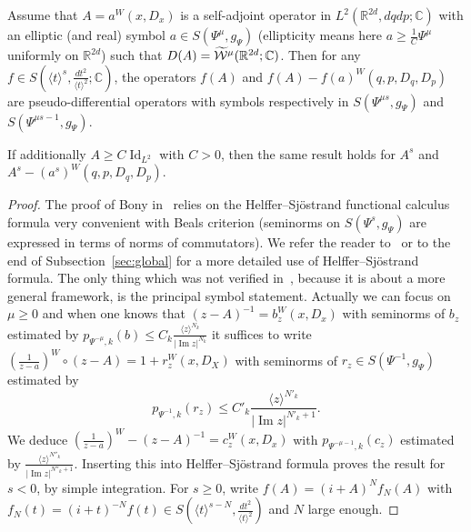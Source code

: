 \documentclass[AHL,Unicode,longabstracts]{cedram}
\newcommand{\C}{\mathbb{C}}
\newcommand{\R}{\mathbb{R}}
\newcommand{\clW}{\mathcal{W}}
\DeclareMathOperator{\Idd}{Id}
\DeclareMathOperator{\Imm}{Im}
\let\oldtilde\tilde
\renewcommand*{\tilde}[1]{\mathchoice{\widetilde{#1}}{\widetilde{#1}}{\oldtilde{#1}}{\oldtilde{#1}}}
\begin{document}
\begin{prop}\label{pr:Bealsfunction}
Assume that $A=a^{W}(x,D_{x})$ is a self-adjoint operator in $L^{2}(\R^{2d},dqdp;\C)$ with an elliptic (and real) symbol $a\in S(\Psi^{\mu},g_{\Psi})$ (ellipticity means here $a\geq \frac{1}{C}\Psi^{\mu}$ uniformly on $\R^{2d}$) such that $D(A)=\tilde{\clW}^{\mu}(\R^{2d};\C)$. Then for any $f\in S(\langle t\rangle^{s}, \frac{dt^{2}}{\langle t\rangle^{2}}; \C)$, the operators $f(A)$ and $f(A)-f(a)^{W}(q,p,D_{q},D_{p})$ are pseudo-differential operators with symbols respectively in $S(\Psi^{\mu s},g_{\Psi})$ and $S(\Psi^{\mu s-1},g_{\Psi})$.

If additionally $A\geq C\Idd_{L^{2}}$ with $C>0$, then the same result holds for $A^{s}$ and $A^{s}-(a^{s})^{W}(q,p,D_{q},D_{p})$.
\end{prop}
\begin{proof}
The proof of Bony in~\cite[Theorem~3.8]{Bon} relies on the Helffer--Sj\"ostrand functional calculus formula very convenient with Beals criterion (seminorms on $S(\Psi^{s},g_{\Psi})$ are expressed in terms of norms of commutators). We refer the reader to~\cite{Bon,DiSj,HeSj} or to the end of Subsection~\ref{sec:global} for a more detailed use of Helffer--Sj\"ostrand formula. The only thing which was not verified in~\cite{Bon}, because it is about a more general framework, is the principal symbol statement. Actually we can focus on $\mu\geq 0$ and when one knows that $(z-A)^{-1}=b_{z}^{W}(x,D_{x})$ with seminorms of $b_{z}$ estimated by $p_{\Psi^{-\mu},k}(b)\leq C_{k}\frac{\langle z\rangle^{N_{k}}}{|\Imm z|^{N_{k}}}$ it suffices to write $(\frac{1}{z-a})^{W}\circ(z-A)=1+r^{W}_{z}(x,D_{X})$ with seminorms of $r_{z}\in S(\Psi^{-1},g_{\Psi})$ estimated by
\[
p_{\Psi^{-1}, k}(r_{z})\leq C'_{k}\frac{\langle z\rangle^{N'_{k}}}{|\Imm z|^{N'_{k}+1}}.
\]
We deduce $(\frac{1}{z-a})^{W}-(z-A)^{-1}=c_{z}^{W}(x,D_{x})$ with $p_{\Psi^{-\mu-1},k}(c_{z})$ estimated by $\frac{\langle z\rangle^{N''_{k}}}{|\Imm z|^{N''_{k}+1}}$. Inserting this into Helffer--Sj\"ostrand formula proves the result for $s<0$, by simple integration. For $s\geq 0$, write $f(A)=(i+A)^{N}f_{N}(A)$ with $f_{N}(t)=(i+t)^{-N}f(t)\in S(\langle t\rangle^{s-N},\frac{dt^{2}}{\langle t\rangle^{2}})$ and $N$ large enough.
\end{proof}
\end{document}

